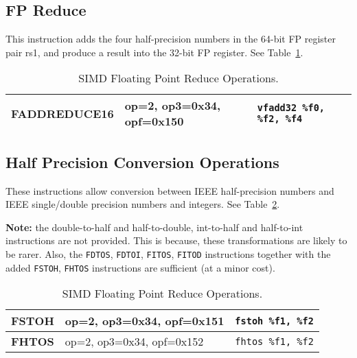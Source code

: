 
\subsection{FP Reduce}
\label{sec:fp reduce}

This instruction adds the four half-precision numbers in the 64-bit FP
register pair rs1, and produce a result into the 32-bit FP register.
See Table~\ref{tab:fp:reduce:ops}.

\begin{table}[p]
  \centering
  \begin{tabular}[p]{|l|l|l|}
    \hline
    \textbf{FADDREDUCE16}
    & {op=2, op3=0x34, opf=0x150}
    & \texttt{vfadd32 \%f0, \%f2, \%f4} \\
    \hline
  \end{tabular}
  \caption[SIMD Floating Point Reduce Operations]{SIMD Floating Point
    Reduce Operations.
  }
  \label{tab:fp:reduce:ops}
\end{table}

\subsection{Half Precision Conversion Operations}
\label{sec:half precision conversion ops}

These  instructions  allow   conversion  between  IEEE  half-precision
numbers and IEEE single/double precision numbers and integers.
See Table~\ref{tab:half:precision:conversion:ops}.

\textbf{Note:} the double-to-half  and half-to-double, int-to-half and
half-to-int  instructions are  not provided.   This is  because, these
transformations  are likely  to be  rarer.  Also,  the \texttt{FDTOS},
\texttt{FDTOI},  \texttt{FITOS}, \texttt{FITOD}  instructions together
with  the   added  \texttt{FSTOH},  \texttt{FHTOS}   instructions  are
sufficient (at a minor cost).

\begin{table}[p]
  \centering
  \begin{tabular}[p]{|l|l|l|}
    \hline
    \textbf{FSTOH}
    & {op=2, op3=0x34, opf=0x151}
    & \texttt{fstoh \%f1, \%f2} \\
    \hline
    \textbf{FHTOS}
    & {op=2, op3=0x34, opf=0x152}
    & \texttt{fhtos \%f1, \%f2} \\
    \hline
  \end{tabular}
  \caption[SIMD Floating Point Reduce Operations]{SIMD Floating Point
    Reduce Operations.
  }
  \label{tab:half:precision:conversion:ops}
\end{table}

